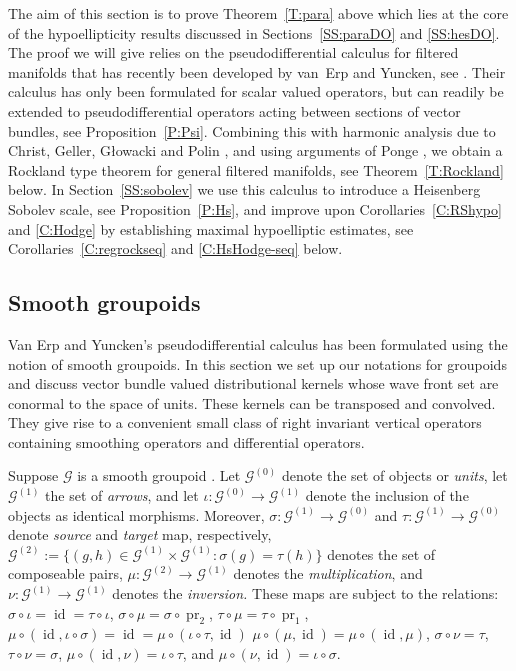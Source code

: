 \documentclass[reqno,12pt]{amsart}
\DeclareMathOperator{\pr}{pr}
\DeclareMathOperator{\id}{id}
\theoremstyle{plain}
\theoremstyle{definition}
\begin{document}
The aim of this section is to prove Theorem~\ref{T:para} above which lies at the core of the hypoellipticity results discussed in Sections~\ref{SS:paraDO} and \ref{SS:hesDO}.
The proof we will give relies on the pseudodifferential calculus for filtered manifolds that has recently been developed by van~Erp and Yuncken, see \cite{EY15,EY16}.
Their calculus has only been formulated for scalar valued operators, but can readily be extended to pseudodifferential operators acting between sections of vector bundles, see Proposition~\ref{P:Psi}.
Combining this with harmonic analysis due to Christ, Geller, G{\l}owacki and Polin \cite{CGGP92}, and using arguments of Ponge \cite{P08}, we obtain a Rockland type theorem for general filtered manifolds, see Theorem~\ref{T:Rockland} below.
In Section~\ref{SS:sobolev} we use this calculus to introduce a Heisenberg Sobolev scale, see Proposition~\ref{P:Hs}, and improve upon Corollaries~\ref{C:RShypo} and \ref{C:Hodge} by establishing maximal hypoelliptic estimates, see Corollaries~\ref{C:regrockseq} and \ref{C:HsHodge-seq} below.





\subsection{Smooth groupoids}\label{SS:Groupoids}





Van Erp and Yuncken's pseudodifferential calculus \cite{EY15} has been formulated using the notion of smooth groupoids.
In this section we set up our notations for groupoids and discuss vector bundle valued distributional kernels whose wave front set are conormal to the space of units.
These kernels can be transposed and convolved.
They give rise to a convenient small class of right invariant vertical operators containing smoothing operators and differential operators.


Suppose $\mathcal G$ is a smooth groupoid \cite{R80}.
Let $\mathcal G^{(0)}$ denote the set of objects or \emph{units}, let $\mathcal G^{(1)}$ the set of \emph{arrows}, and let $\iota\colon\mathcal G^{(0)}\to\mathcal G^{(1)}$ denote the inclusion of the objects as identical morphisms.
Moreover, $\sigma\colon\mathcal G^{(1)}\to\mathcal G^{(0)}$ and $\tau\colon\mathcal G^{(1)}\to\mathcal G^{(0)}$ denote \emph{source} and \emph{target} map, respectively, $\mathcal G^{(2)}:=\{(g,h)\in\mathcal G^{(1)}\times \mathcal G^{(1)}:\sigma(g)=\tau(h)\}$ denotes the set of composeable pairs, $\mu\colon\mathcal G^{(2)}\to\mathcal G^{(1)}$ denotes the \emph{multiplication}, and $\nu\colon\mathcal G^{(1)}\to\mathcal G^{(1)}$ denotes the \emph{inversion.}
These maps are subject to the relations:
$\sigma\circ\iota=\id=\tau\circ\iota$,
$\sigma\circ\mu=\sigma\circ\pr_2$,
$\tau\circ\mu=\tau\circ\pr_1$,
$\mu\circ(\id,\iota\circ\sigma)=\id=\mu\circ(\iota\circ\tau,\id)$
$\mu\circ(\mu,\id)=\mu\circ(\id,\mu)$, 
$\sigma\circ\nu=\tau$, $\tau\circ\nu=\sigma$, 
$\mu\circ(\id,\nu)=\iota\circ\tau$, and
$\mu\circ(\nu,\id)=\iota\circ\sigma$.
\end{document}

